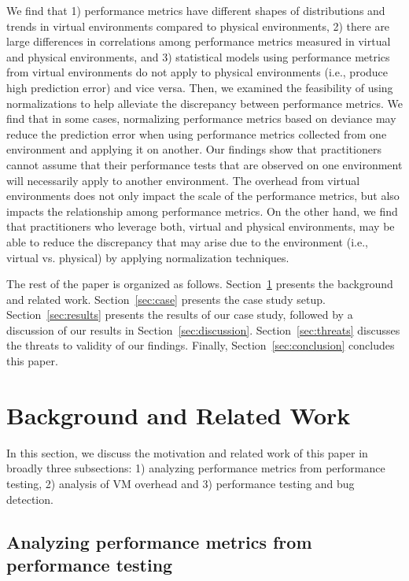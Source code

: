 \documentclass[smallextended]{svjour3}       %
\begin{document}
We find that 1) performance metrics have different shapes of distributions and trends in virtual environments compared to physical environments, 2) there are large differences in correlations among performance metrics measured in virtual and physical environments, and 3) statistical models using performance metrics from virtual environments do not apply to physical environments (i.e., produce high prediction error) and vice versa. Then, we examined the feasibility of using normalizations to help alleviate the discrepancy between performance metrics. We find that in some cases, normalizing performance metrics based on deviance may reduce the prediction error when using performance metrics collected from one environment and applying it on another. Our findings show that practitioners cannot assume that their performance tests that are observed on one environment will necessarily apply to another environment. The overhead from virtual environments does not only impact the scale of the performance metrics, but also impacts the relationship among performance metrics. On the other hand, we find that practitioners who leverage both, virtual and physical environments, may be able to reduce the discrepancy that may arise due to the environment (i.e., virtual vs. physical) by applying normalization techniques.

The rest of the paper is organized as follows. Section~\ref{sec:related} presents the background and related work. Section~\ref{sec:case} presents the case study setup. Section~\ref{sec:results} presents the results of our case study, followed by a discussion of our results in Section~\ref{sec:discussion}. Section~\ref{sec:threats} discusses the threats to validity of our findings. Finally, Section~\ref{sec:conclusion} concludes this paper.


\section{Background and Related Work}
\label{sec:related}
In this section, we discuss the motivation and related work of this paper in broadly three subsections: 1) analyzing performance metrics from performance testing, 2) analysis of VM overhead and 3) performance testing and bug detection.


\subsection{Analyzing performance metrics from performance testing} 
\end{document}
